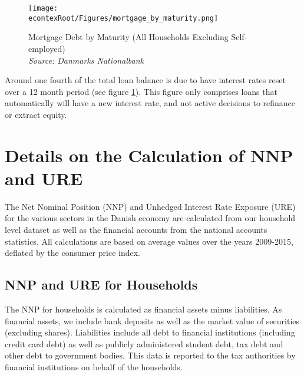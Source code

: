 \documentclass[titlepage]{\econtex}\newcommand{\texname}{ConsumptionHeterogeneity}
\begin{document}
\begin{figure} 
	\begin{centering}
		\texttt{[image: \\econtexRoot/Figures/mortgage\_by\_maturity.png]} 
		\caption{Mortgage Debt by Maturity (All Households Excluding Self-employed)
		{\\ \emph{\footnotesize
	{Source: Danmarks Nationalbank}}
	}}
		\label{fig:mortgage_by_maturity}
	\end{centering}
\end{figure}

Around one fourth of the total loan balance is due to have interest rates reset over a 12 month period (see figure \ref{fig:mortgage_by_maturity}). This figure only comprises loans that automatically will have a new interest rate, and not active decisions to refinance or extract equity. 

\section{Details on the Calculation of NNP and URE}
\setcounter{figure}{0}   
\setcounter{table}{0} 
\label{URE_NNP_appendix}
The Net Nominal Position (NNP) and Unhedged Interest Rate Exposure (URE) for the various sectors in the Danish economy are calculated from our household level dataset as well as the financial accounts from the national accounts statistics. All calculations are based on average values over the years 2009-2015, deflated by the consumer price index. 

\subsection{NNP and URE for Households}
The NNP for households is calculated as financial assets minus liabilities. As financial assets, we include bank deposits as well as the market value of securities (excluding shares). Liabilities include all debt to financial institutions (including credit card debt) as well as publicly administered student debt, tax debt and other debt to government bodies. This data is reported to the tax authorities by financial institutions on behalf of the households. 
\end{document}
